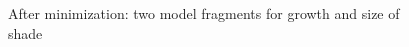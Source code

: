 \documentclass{article} %
\begin{document}

\begin{figure}[ht]
\centering
{}
\caption{After minimization: two model fragments for growth and size of shade}
\label{ts_frags}
\end{figure}

\end{document}
